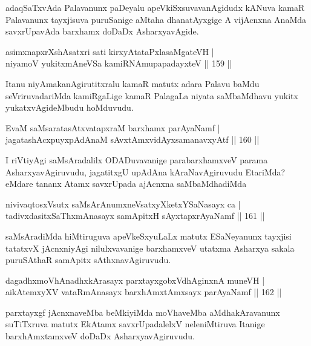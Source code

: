 \begin{artha}
adaqSaTxvAda Palavanunx paDeyalu apeVkiSxsuvavanAgidudx kANuva kamaR Palavanunx tayxjisuva puruSanige aMtaha dhanatAyxgige A vijAcnxna AnaMda savxrUpavAda barxhamx doDaDx AsharxyavAgide.
\end{artha}

\begin{shl}
asimxnapxrXshAsatxri sati kirxyAtataPxlasaMgateVH |\\
niyamoV yukitxmAneVSa kamiRNAmupapadayxteV \hfill || 159 ||
\end{shl}

\begin{artha}
Itanu niyAmakanAgirutitxralu kamaR matutx adara Palavu baMdu seVriruvadariMda kamiRgaLige kamaR PalagaLa niyata saMbaMdhavu yukitx yukatxvAgideMbudu hoMduvudu.
\end{artha}

\begin{shl}
EvaM saMsaratasAtxvatapxraM barxhamx parAyaNamf |\\
jagatashAcxpuyxpAdAnaM sAvxtAmxvidAyxsamanavxyAtf \hfill || 160 ||
\end{shl}

\begin{artha}%
I riVtiyAgi saMsAradalilx ODADuvavanige parabarxhamxveV parama AsharxyavAgiruvudu, jagatitxgU upAdAna kAraNavAgiruvudu EtariMda? eMdare tananx Atamx savxrUpada ajAcnxna saMbaMdhadiMda
\end{artha}

\begin{shl}
nivivaqtosxVsutx saMsArAnumxneVsatxyXketxYSaNasayx ca |\\
tadivxdasitxSaThxmAnasayx samApitxH sAyxtapxrAyaNamf \hfill || 161 ||
\end{shl}

\begin{artha}
saMsAradiMda hiMtiruguva apeVkeSxyuLaLx matutx ESaNeyanunx tayxjisi tatatxvX jAcnxniyAgi nilulxvavanige barxhamxveV utatxma Asharxya sakala puruSAthaR samApitx sAthxnavAgiruvudu.
\end{artha}

\begin{shl}
dagadhxmoVhAnadhxkArasayx parxtayxgobxVdhAginxnA muneVH |\\
aikAtemxyXV vataRmAnasayx barxhAmxtAmx\s sayx parAyaNamf \hfill || 162 ||
\end{shl}

\begin{artha}
parxtayxgf jAcnxnaveMba beMkiyiMda moVhaveMba aMdhakAravanunx suTiTxruva matutx EkAtamx savxrUpadalelxV neleniMtiruva Itanige barxhAmxtamxveV doDaDx AsharxyavAgiruvudu.
\end{artha}


